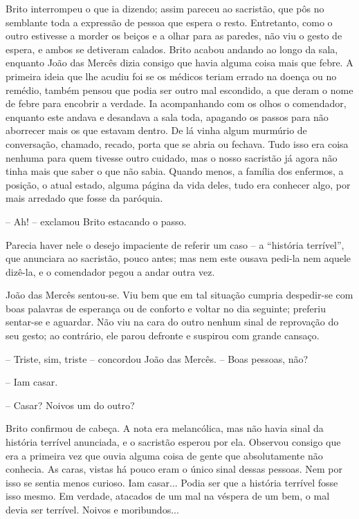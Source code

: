 Brito interrompeu o que ia dizendo; assim pareceu ao sacristão, que pôs
no semblante toda a expressão de pessoa que espera o resto. Entretanto,
como o outro estivesse a morder os beiços e a olhar para as paredes, não
viu o gesto de espera, e ambos se detiveram calados. Brito acabou
andando ao longo da sala, enquanto João das Mercês dizia consigo que
havia alguma coisa mais que febre. A primeira ideia que lhe acudiu foi
se os médicos teriam errado na doença ou no remédio, também pensou que
podia ser outro mal escondido, a que deram o nome de febre para encobrir
a verdade. Ia acompanhando com os olhos o comendador, enquanto este
andava e desandava a sala toda, apagando os passos para não aborrecer
mais os que estavam dentro. De lá vinha algum murmúrio de conversação,
chamado, recado, porta que se abria ou fechava. Tudo isso era coisa
nenhuma para quem tivesse outro cuidado, mas o nosso sacristão já agora
não tinha mais que saber o que não sabia. Quando menos, a família dos
enfermos, a posição, o atual estado, alguma página da vida deles, tudo
era conhecer algo, por mais arredado que fosse da paróquia.

-- Ah! -- exclamou Brito estacando o passo.

Parecia haver nele o desejo impaciente de referir um caso -- a
``história terrível'', que anunciara ao sacristão, pouco antes; mas nem
este ousava pedi-la nem aquele dizê-la, e o comendador pegou a andar
outra vez.

João das Mercês sentou-se. Viu bem que em tal situação cumpria
despedir-se com boas palavras de esperança ou de conforto e voltar no
dia seguinte; preferiu sentar-se e aguardar. Não viu na cara do outro
nenhum sinal de reprovação do seu gesto; ao contrário, ele parou
defronte e suspirou com grande cansaço.

-- Triste, sim, triste -- concordou João das Mercês. -- Boas pessoas,
não?

-- Iam casar.

-- Casar? Noivos um do outro?

Brito confirmou de cabeça. A nota era melancólica, mas não havia sinal
da história terrível anunciada, e o sacristão esperou por ela. Observou
consigo que era a primeira vez que ouvia alguma coisa de gente que
absolutamente não conhecia. As caras, vistas há pouco eram o único sinal
dessas pessoas. Nem por isso se sentia menos curioso. Iam casar... Podia
ser que a história terrível fosse isso mesmo. Em verdade, atacados de um
mal na véspera de um bem, o mal devia ser terrível. Noivos e
moribundos...

